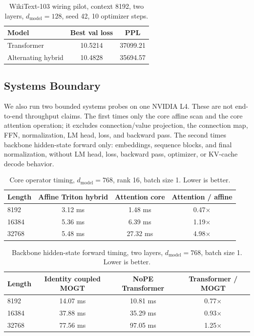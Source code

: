 \documentclass[10pt]{article}
\newcommand{\mogt}{MOGT}
\begin{document}
\begin{table}[h]
\centering
\caption{WikiText-103 wiring pilot, context 8192, two layers, $d_{\mathrm{model}}=128$, seed 42, 10 optimizer steps.}
\label{tab:lm-pilot}
\begin{tabular}{lcc}
\toprule
Model & Best val loss & PPL \\
\midrule
Transformer & 10.5214 & 37099.21 \\
Alternating hybrid & 10.4828 & 35694.57 \\
\bottomrule
\end{tabular}
\end{table}

\subsection{Systems Boundary}

We also run two bounded systems probes on one NVIDIA L4. These are not
end-to-end throughput claims. The first times only the core affine scan and the
core attention operation; it excludes connection/value projection, the
connection map, FFN, normalization, LM head, loss, and backward pass. The
second times backbone hidden-state forward only: embeddings, sequence blocks,
and final normalization, without LM head, loss, backward pass, optimizer, or
KV-cache decode behavior.

\begin{table}[h]
\centering
\caption{Core operator timing, $d_{\mathrm{model}}=768$, rank 16, batch size 1. Lower is better.}
\label{tab:systems-core}
\begin{tabular}{lccc}
\toprule
Length & Affine Triton hybrid & Attention core & Attention / affine \\
\midrule
8192  & 3.12 ms & 1.48 ms  & 0.47$\times$ \\
16384 & 5.36 ms & 6.39 ms  & 1.19$\times$ \\
32768 & 5.48 ms & 27.32 ms & 4.98$\times$ \\
\bottomrule
\end{tabular}
\end{table}

\begin{table}[h]
\centering
\caption{Backbone hidden-state forward timing, two layers, $d_{\mathrm{model}}=768$, batch size 1. Lower is better.}
\label{tab:systems-backbone}
\begin{tabular}{lccc}
\toprule
Length & Identity coupled \mogt{} & NoPE Transformer & Transformer / \mogt{} \\
\midrule
8192  & 14.07 ms & 10.81 ms & 0.77$\times$ \\
16384 & 37.88 ms & 35.29 ms & 0.93$\times$ \\
32768 & 77.56 ms & 97.05 ms & 1.25$\times$ \\
\bottomrule
\end{tabular}
\end{table}
\end{document}
